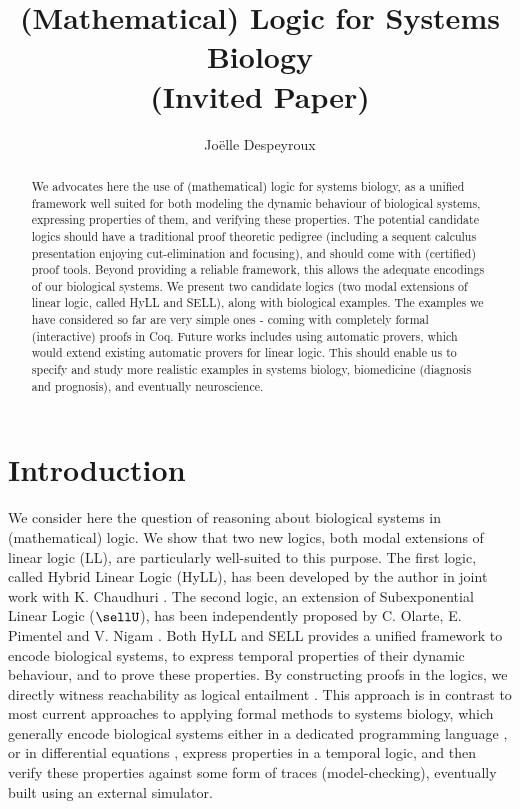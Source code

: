 \documentclass{llncs}
\title{(Mathematical) Logic for Systems Biology \\ (Invited Paper)
}
\author{Jo{\"e}lle Despeyroux}
\institute{INRIA and CNRS, I3S, Sophia-Antipolis, France \\
joelle.despeyroux@inria.fr}
\begin{document}
\maketitle

\begin{abstract}
We advocates here the use of (mathematical) logic for systems biology, 
as a unified framework well suited for both modeling the dynamic behaviour of 
biological systems, expressing properties of them, and verifying these 
properties. 
The potential candidate logics should have a traditional proof theoretic 
pedigree (including a sequent calculus presentation enjoying cut-elimination 
and focusing), and should come with (certified) proof tools. Beyond providing 
a reliable framework, this allows the adequate encodings of our biological 
systems.
We present two candidate logics (two modal extensions of linear logic,
 called HyLL and SELL), along with biological examples. 
The examples we have considered so far are very simple ones 
- coming with completely formal (interactive) proofs in Coq.
Future works includes using automatic provers, which would extend existing 
automatic provers for linear logic. This should enable us to specify and study 
more realistic examples in systems biology, biomedicine (diagnosis and 
prognosis), and eventually neuroscience.
\end{abstract}



\section{Introduction} \label{sec:intro}
% 
We consider here the question of reasoning about 
biological systems in (mathematical) logic.
We show that two new logics, both modal extensions of 
linear logic \cite{girard87tcs} (LL),
are particularly well-suited to this purpose.
The first logic, called Hybrid Linear Logic (HyLL), has been developed by the 
author in joint work with K. Chaudhuri \cite{ChaudhuriDespeyroux:14}.
The second logic, an extension of Subexponential Linear Logic ($\sellU$),
has been independently proposed by C. Olarte, E. Pimentel and 
V. Nigam \cite{NigamOlartePimentel:concur-13}. 
Both HyLL and SELL provides a unified
framework to encode biological systems, to express temporal properties
of their dynamic behaviour, and to prove these properties.  
By constructing proofs in the logics, 
we directly witness reachability as logical entailment
\cite{deMaria-Despeyroux-Felty:14-fmmb,DBLP:journals/entcs/ChiarugiFHO15}.  
%
This approach is in contrast to
most current approaches to applying formal methods to systems biology,
which generally 
encode biological systems either in a 
dedicated programming language
\cite{PC05tcsb,FS08sfm,Danos:09-tcs},
or in differential equations \cite{CampagnaPiazza:entcs09},
express properties in a temporal logic, 
and then verify these properties against some form of traces 
(model-checking), 
eventually built using an external simulator.
\end{document}
